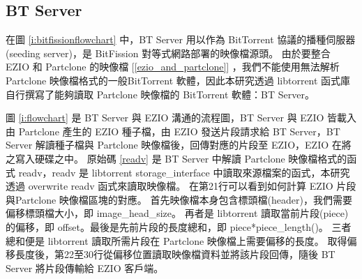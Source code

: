 \subsection{BT Server}

在圖 \ref{i:bitfissionflowchart} 中，BT Server 用以作為 BitTorrent 協議的播種伺服器(seeding server)，是 BitFission 對等式網路部署的映像檔源頭。
由於要整合 EZIO 和 Partclone 的映像檔 [\ref{ezio_and_partclone}] ，我們不能使用無法解析 Partclone 映像檔格式的一般BitTorrent 軟體，因此本研究透過 libtorrent 函式庫自行撰寫了能夠讀取 Partclone 映像檔的 BitTorrent 軟體：BT Server。

圖 \ref{i:flowchart} 是 BT Server 與 EZIO 溝通的流程圖，BT Server 與 EZIO 皆載入由 Partclone 產生的 EZIO 種子檔，由 EZIO 發送片段請求給 BT Server，BT Server 解讀種子檔與 Partclone 映像檔後，回傳對應的片段至 EZIO，EZIO 在將之寫入硬碟之中。
原始碼 \ref{readv} 是 BT Server 中解讀 Partclone 映像檔格式的函式 readv，readv 是 libtorrent storage\_interface 中讀取來源檔案的函式，本研究透過 overwrite readv 函式來讀取映像檔。
在第21行可以看到如何計算 EZIO 片段與Partclone 映像檔區塊的對應。
首先映像檔本身包含標頭檔(header)，我們需要偏移標頭檔大小，即 image\_head\_size。
再者是 libtorrent 讀取當前片段(piece)的偏移，即 offset。最後是先前片段的長度總和，即 piece*piece\_length()。
三者總和便是 libtorrent 讀取所需片段在 Partclone 映像檔上需要偏移的長度。
取得偏移長度後，第22至30行從偏移位置讀取映像檔資料並將該片段回傳，隨後 BT Server 將片段傳輸給 EZIO 客戶端。



